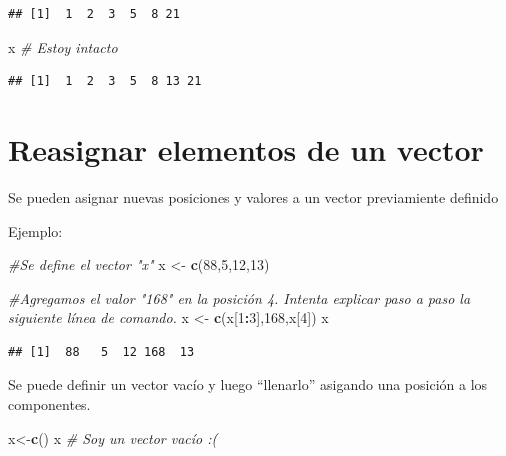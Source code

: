 \documentclass[
]{book}
\newenvironment{Shaded}{\begin{snugshade}}{\end{snugshade}}
\newcommand{\CommentTok}[1]{\textcolor[rgb]{0.56,0.35,0.01}{\textit{#1}}}
\newcommand{\DecValTok}[1]{\textcolor[rgb]{0.00,0.00,0.81}{#1}}
\newcommand{\FunctionTok}[1]{\textcolor[rgb]{0.13,0.29,0.53}{\textbf{#1}}}
\newcommand{\NormalTok}[1]{#1}
\newcommand{\OtherTok}[1]{\textcolor[rgb]{0.56,0.35,0.01}{#1}}
\newcommand{\SpecialCharTok}[1]{\textcolor[rgb]{0.81,0.36,0.00}{\textbf{#1}}}
\begin{document}
\begin{verbatim}
## [1]  1  2  3  5  8 21
\end{verbatim}

\begin{Shaded}
\begin{Highlighting}[]
\NormalTok{x     }\CommentTok{\# Estoy intacto}
\end{Highlighting}
\end{Shaded}

\begin{verbatim}
## [1]  1  2  3  5  8 13 21
\end{verbatim}

\hypertarget{reasignar-elementos-de-un-vector}{%
\section{Reasignar elementos de un vector}\label{reasignar-elementos-de-un-vector}}

Se pueden asignar nuevas posiciones y valores a un vector previamiente definido

Ejemplo:

\begin{Shaded}
\begin{Highlighting}[]
\CommentTok{\#Se define el vector "x"}
\NormalTok{x }\OtherTok{\textless{}{-}} \FunctionTok{c}\NormalTok{(}\DecValTok{88}\NormalTok{,}\DecValTok{5}\NormalTok{,}\DecValTok{12}\NormalTok{,}\DecValTok{13}\NormalTok{)}

\CommentTok{\#Agregamos el valor "168" en la posición 4. Intenta explicar paso a paso la siguiente línea de comando. }
\NormalTok{x }\OtherTok{\textless{}{-}} \FunctionTok{c}\NormalTok{(x[}\DecValTok{1}\SpecialCharTok{:}\DecValTok{3}\NormalTok{],}\DecValTok{168}\NormalTok{,x[}\DecValTok{4}\NormalTok{]) }
\NormalTok{x}
\end{Highlighting}
\end{Shaded}

\begin{verbatim}
## [1]  88   5  12 168  13
\end{verbatim}

Se puede definir un vector vacío y luego ``llenarlo'' asigando una posición a los componentes.

\begin{Shaded}
\begin{Highlighting}[]
\NormalTok{x}\OtherTok{\textless{}{-}}\FunctionTok{c}\NormalTok{()}
\NormalTok{x                 }\CommentTok{\# Soy un vector vacío :(}
\end{Highlighting}
\end{Shaded}
\end{document}
